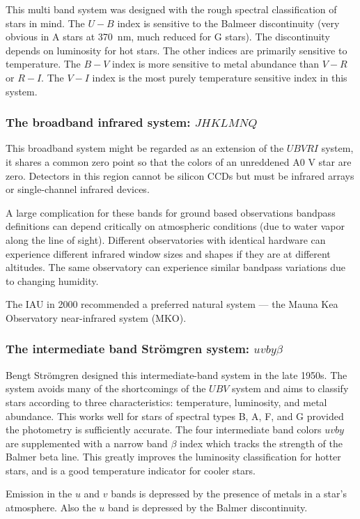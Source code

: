 This multi band system was designed with the rough spectral
classification of stars in mind. The $U-B$ index is sensitive to the
Balmeer discontinuity (very obvious in A stars at 370~nm, much reduced
for G stars). The discontinuity  depends on luminosity for hot
stars. The other indices are primarily sensitive to temperature. The
$B-V$ index is more sensitive to metal abundance than $V-R$ or
$R-I$. The $V-I$ index is the most purely temperature sensitive index
in this system.

\subsubsection{The broadband infrared system: $JHKLMNQ$}
This broadband
system might be regarded as an extension of the $UBVRI$ system, it
shares a common zero point so that the colors of an unreddened A0 V
star are zero. Detectors in this region cannot be silicon CCDs but
must be infrared arrays or single-channel infrared devices. 

A large complication for these bands for ground based observations
bandpass definitions can depend critically on atmospheric conditions
(due to water vapor along the line of sight). Different observatories
with identical hardware can experience different infrared window sizes
and shapes if they are at different altitudes. The same observatory
can experience similar bandpass variations due to changing humidity. 

The IAU in 2000 recommended a preferred natural system --- the Mauna
Kea Observatory near-infrared system (MKO).

\subsubsection{The intermediate band Str\"omgren system: $uvby\beta$}
Bengt Str\"omgren designed this intermediate-band system in the late
1950s. The system avoids many of the shortcomings of the $UBV$ system
and aims to classify stars according to three characteristics:
temperature, luminosity, and metal abundance. This works well for
stars of spectral types B, A, F, and G provided the photometry is
sufficiently accurate. The four intermediate band colors $uvby$ are
supplemented with a narrow band $\beta$ index which tracks the
strength of the Balmer beta line. This greatly improves the
luminosity classification for hotter stars, and is a good temperature
indicator for cooler stars.

Emission in the $u$ and $v$ bands is depressed by the presence of
metals in a star's atmosphere. Also the $u$ band is depressed by the
Balmer discontinuity. 

